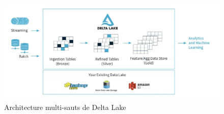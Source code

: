 \cite{databricksdelta}

\begin{figure}[H]
\centering
\includegraphics[width=\linewidth]{images/delta_lake_architecture.png}
\caption{Architecture multi-sauts de Delta Lake}\label{fig:delta-lake-architecture}
\end{figure}

